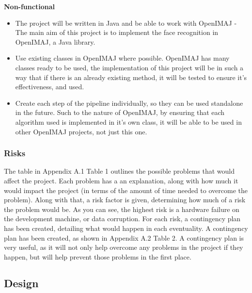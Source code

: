 \documentclass[12pt, a4paper]{article}
\begin{document}
\textbf{Non-functional}
\begin{itemize}
\item The project will be written in Java and be able to work with OpenIMAJ - The main aim of this project is to implement the face recognition in OpenIMAJ, a Java library.
\item Use existing classes in OpenIMAJ where possible. OpenIMAJ has many classes ready to be used, the implementation of this project will be in such a way that if there is an already existing method, it will be tested to ensure it’s effectiveness, and used.
\item Create each step of the pipeline individually, so they can be used standalone in the future. Such to the nature of OpenIMAJ, by ensuring that each algorithm used is implemented in it’s own class, it will be able to be used in other OpenIMAJ projects, not just this one. 
\end{itemize}
\subsubsection{Risks}
The table in Appendix A.1 Table 1 outlines the possible problems that would affect the project. Each problem has a an explanation, along with how much it would impact the project (in terms of the amount of time needed to overcome the problem). Along with that, a risk factor is given, determining how much of a risk the problem would be. As you can see, the highest risk is a hardware failure on the development machine, or data corruption. For each risk, a contingency plan has been created, detailing what would happen in each eventuality. A contingency plan has been created, as shown in Appendix A.2 Table 2. A contingency plan is very useful, as it will not only help overcome any problems in the project if they happen, but will help prevent those problems in the first place. 

\subsection{Design}
\end{document}
